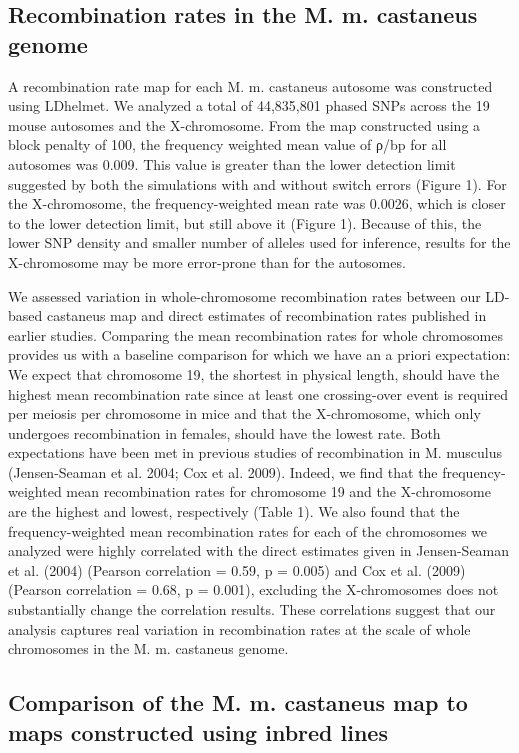 \subsection{Recombination rates in the M. m. castaneus genome}
 
A recombination rate map for each M. m. castaneus autosome was constructed using LDhelmet. We analyzed a total of 44,835,801 phased SNPs across the 19 mouse autosomes and the X-chromosome. From the map constructed using a block penalty of 100, the frequency weighted mean value of ρ/bp for all autosomes was 0.009. This value is greater than the lower detection limit suggested by both the simulations with and without switch errors (Figure 1). For the X-chromosome, the frequency-weighted mean rate was 0.0026, which is closer to the lower detection limit, but still above it (Figure 1). Because of this, the lower SNP density and smaller number of alleles used for inference, results for the X-chromosome may be more error-prone than for the autosomes. 
 
We assessed variation in whole-chromosome recombination rates between our LD-based castaneus map and direct estimates of recombination rates published in earlier studies. Comparing the mean recombination rates for whole chromosomes provides us with a baseline comparison for which we have an a priori expectation: We expect that chromosome 19, the shortest in physical length, should have the highest mean recombination rate since at least one crossing-over event is required per meiosis per chromosome in mice and that the X-chromosome, which only undergoes recombination in females, should have the lowest rate. Both expectations have been met in previous studies of recombination in M. musculus (Jensen-Seaman et al. 2004; Cox et al. 2009). Indeed, we find that the frequency-weighted mean recombination rates for chromosome 19 and the X-chromosome are the highest and lowest, respectively (Table 1). We also found that the frequency-weighted mean recombination rates for each of the chromosomes we analyzed were highly correlated with the direct estimates given in Jensen-Seaman et al. (2004) (Pearson correlation = 0.59, p = 0.005) and Cox et al. (2009) (Pearson correlation = 0.68, p = 0.001), excluding the X-chromosomes does not substantially change the correlation results. These correlations suggest that our analysis captures real variation in recombination rates at the scale of whole chromosomes in the M. m. castaneus genome. 

\subsection{Comparison of the M. m. castaneus map to maps constructed using inbred lines}
 
